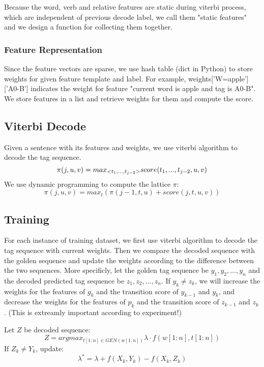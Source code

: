 \documentclass[11pt,a4paper]{article}
\begin{document}
Because the word, verb and relative features are static during viterbi process, which are 
independent of previous decode label, we call them "static features" and we design a function 
for collecting them together.

\subsubsection{Feature Representation}
Since the feature vectors are sparse, we use hash table (dict in Python) to store weights for given 
feature template and label. For example, weights['W=apple']['A0-B'] indicates the weight for feature 
"current word is apple and tag is A0-B". We store features in a list and retrieve weights for them and 
compute the score.

\subsection{Viterbi Decode}
Given a sentence with its features and weights, we use viterbi algorithm to decode the 
tag sequence.
\begin{equation}
\pi(j,u,v)=\\
max_{<t_1, ..., t_{j-2}>}score(t_1, ..., t_{j-2}, u, v)
\end{equation}
We use dynamic programming to compute the lattice $\pi$:
\begin{equation}
\pi(j,u,v)=max_t(\pi(j-1,t,u)+score(j,t,u,v))
\end{equation}

\subsection{Training}
For each instance of training dataset, we first use viterbi algorithm to decode the tag sequence 
with current weights. Then we compare the decoded sequence with the golden sequence and update 
the weights according to the difference between the two sequences. More specificly, let the 
golden tag sequence be $y_1, y_2, ..., y_n$ and the decoded predicted tag sequence be 
$z_1, z_2, ..., z_n$. If $y_k \neq z_k$, we will increase the weights for the features of $g_k$ 
and the transition score of $y_{k-1}$ and $y_k$, and decrease the weights for the features of 
$p_k$ and the transition score of $z_{k-1}$ and $z_k$. (This is extreamly important according to
experiment!)

Let $Z$ be decoded sequence:
$$Z=argmax_{t[1:n]\in GEN(w[1:n])} \lambda\cdot f(w[1:n],t[1:n]) $$ 
If $Z_k \neq Y_k$, update:
$$\lambda^* = \lambda + f(X_k, Y_k) - f(X_k, Z_k)$$
\end{document}
